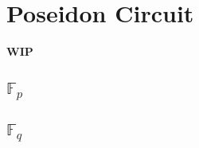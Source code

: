 \section{Poseidon Circuit}
\label{section:poseidon}
\textbf{WIP}
\subsection{$\mathbb{F}_p$}

\subsection{$\mathbb{F}_q$}